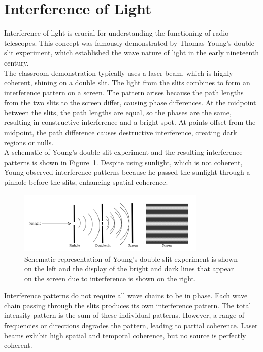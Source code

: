 \clearpage

\section{Interference of Light}

Interference of light is crucial for understanding the functioning of radio telescopes. This concept was famously demonstrated by Thomas Young's double-slit experiment, which established the wave nature of light in the early nineteenth century. \\

The classroom demonstration typically uses a laser beam, which is highly coherent, shining on a double slit. The light from the slits combines to form an interference pattern on a screen. The pattern arises because the path lengths from the two slits to the screen differ, causing phase differences. At the midpoint between the slits, the path lengths are equal, so the phases are the same, resulting in constructive interference and a bright spot. At points offset from the midpoint, the path difference causes destructive interference, creating dark regions or nulls. \\

A schematic of Young's double-slit experiment and the resulting interference patterns is shown in Figure~\ref{fig:double_slit}. Despite using sunlight, which is not coherent, Young observed interference patterns because he passed the sunlight through a pinhole before the slits, enhancing spatial coherence. 

\begin{figure}[H]
    \centering
    \includegraphics[width=0.8\textwidth]{Images/double_slit.png} 
    \caption{Schematic representation of Young’s double-slit experiment is shown on the left and the display of the bright and dark lines that appear on the screen due to interference is shown on the right.}
    \label{fig:double_slit}
\end{figure}

Interference patterns do not require all wave chains to be in phase. Each wave chain passing through the slits produces its own interference pattern. The total intensity pattern is the sum of these individual patterns. However, a range of frequencies or directions degrades the pattern, leading to partial coherence. Laser beams exhibit high spatial and temporal coherence, but no source is perfectly coherent. \\

